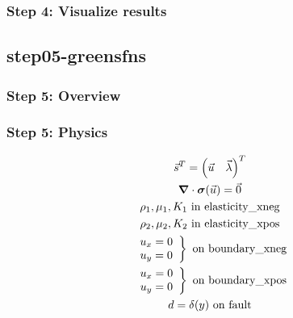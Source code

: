\documentclass[aspectratio=169]{beamer}
\begin{document}
\begin{frame}
  \frametitle{Step 4: Visualize results}

    
\end{frame}


\subsection{step05-greensfns}

\begin{frame}
  \frametitle{Step 5: Overview}

      
\end{frame}

\begin{frame}
  \frametitle{Step 5: Physics}
  \summary{}

  \begin{minipage}{0.35\textwidth}
    {\scriptsize
    \begin{gather*}
    \vec{s}^T = \left( \vec{u} \quad \vec{\lambda} \right)^T \\
    \bm{\nabla} \cdot \bm{\sigma}(\vec{u}) = \vec{0} \\
    \rho_1, \mu_1, K_1 \text{ in elasticity\_xneg} \\ 
    \rho_2, \mu_2, K_2 \text{ in elasticity\_xpos} \\ 
    \left. \begin{array}{c} u_x = 0 \\ u_y = 0 \end{array}\right\} \text{ on boundary\_xneg} \\
    \left. \begin{array}{c} u_x = 0 \\ u_y = 0 \end{array}\right\} \text{ on boundary\_xpos} \\
    d = \delta(y) \text{ on fault}
    \end{gather*}}
  \end{minipage}
  \hfill
  \begin{minipage}{0.60\textwidth}
  \end{minipage}
      
\end{frame}
\end{document}
